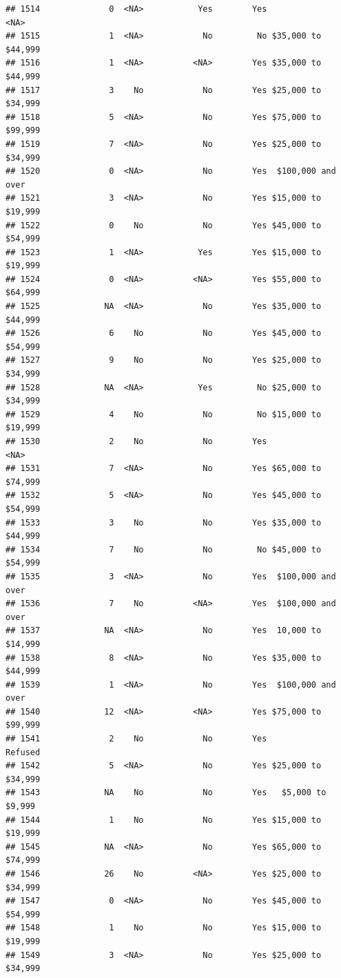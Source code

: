 \documentclass[man]{apa6}
\begin{document}
\begin{verbatim}
## 1514              0  <NA>           Yes        Yes               <NA>
## 1515              1  <NA>            No         No $35,000 to $44,999
## 1516              1  <NA>          <NA>        Yes $35,000 to $44,999
## 1517              3    No            No        Yes $25,000 to $34,999
## 1518              5  <NA>            No        Yes $75,000 to $99,999
## 1519              7  <NA>            No        Yes $25,000 to $34,999
## 1520              0  <NA>            No        Yes  $100,000 and over
## 1521              3  <NA>            No        Yes $15,000 to $19,999
## 1522              0    No            No        Yes $45,000 to $54,999
## 1523              1  <NA>           Yes        Yes $15,000 to $19,999
## 1524              0  <NA>          <NA>        Yes $55,000 to $64,999
## 1525             NA  <NA>            No        Yes $35,000 to $44,999
## 1526              6    No            No        Yes $45,000 to $54,999
## 1527              9    No            No        Yes $25,000 to $34,999
## 1528             NA  <NA>           Yes         No $25,000 to $34,999
## 1529              4    No            No         No $15,000 to $19,999
## 1530              2    No            No        Yes               <NA>
## 1531              7  <NA>            No        Yes $65,000 to $74,999
## 1532              5  <NA>            No        Yes $45,000 to $54,999
## 1533              3    No            No        Yes $35,000 to $44,999
## 1534              7    No            No         No $45,000 to $54,999
## 1535              3  <NA>            No        Yes  $100,000 and over
## 1536              7    No          <NA>        Yes  $100,000 and over
## 1537             NA  <NA>            No        Yes  10,000 to $14,999
## 1538              8  <NA>            No        Yes $35,000 to $44,999
## 1539              1  <NA>            No        Yes  $100,000 and over
## 1540             12  <NA>          <NA>        Yes $75,000 to $99,999
## 1541              2    No            No        Yes            Refused
## 1542              5  <NA>            No        Yes $25,000 to $34,999
## 1543             NA    No            No        Yes   $5,000 to $9,999
## 1544              1    No            No        Yes $15,000 to $19,999
## 1545             NA  <NA>            No        Yes $65,000 to $74,999
## 1546             26    No          <NA>        Yes $25,000 to $34,999
## 1547              0  <NA>            No        Yes $45,000 to $54,999
## 1548              1    No            No        Yes $15,000 to $19,999
## 1549              3  <NA>            No        Yes $25,000 to $34,999

\end{verbatim}
\end{document}
